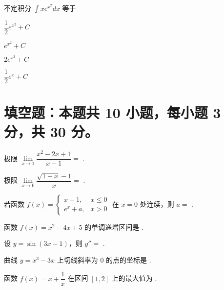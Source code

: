 \documentclass{exam-zh}
\begin{document}
\begin{question}
  不定积分 $\int x e^{x^2} dx$ 等于\paren[A]
  \begin{choices}
  \item $\dfrac{1}{2} e^{x^2} + C$
  \item $e^{x^2} + C$
  \item $2 e^{x^2} + C$
  \item $\dfrac{1}{2} e^x + C$
  \end{choices}
\end{question}

\section{填空题：本题共 10 小题，每小题 3 分，共 30 分。}

\begin{question}
  极限 $\lim\limits_{x \to 1} \dfrac{x^2 - 2x + 1}{x - 1} =$ \fillin[$0$].
\end{question}

\begin{question}
  极限 $\lim\limits_{x \to 0} \dfrac{\sqrt{1 + x} - 1}{x} =$ \fillin[$\dfrac{1}{2}$].
\end{question}

\begin{question}
  若函数 $f(x) = \begin{cases} 
  x + 1, & x \leq 0 \\
  e^x + a, & x > 0 
  \end{cases}$ 在 $x = 0$ 处连续，则 $a =$ \fillin[$0$].
\end{question}
\begin{question}
    函数 $f(x) = x^2 - 4x + 5$ 的单调递增区间是 .
  \end{question}
  
\begin{question}
  设 $y = \sin(3x - 1)$，则 $y'' =$ \fillin[$-9\sin(3x - 1)$].
\end{question}

\begin{question}
  曲线 $y = x^3 - 3x$ 上切线斜率为 $0$ 的点的坐标是 \fillin[$(1, -2)$ 和 $(-1, 2)$].
\end{question}

\begin{question}
  函数 $f(x) = x + \dfrac{1}{x}$ 在区间 $[1, 2]$ 上的最大值为 \fillin[$\dfrac{5}{2}$].
\end{question}
\end{document}
